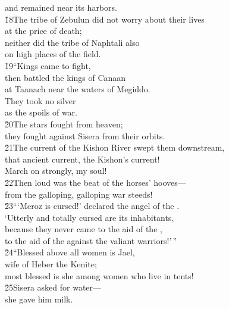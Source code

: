 \begin{poetry}
\poemll    and remained near its harbors. \\
\poeml \v{18}The tribe of Zebulun did not worry about their lives \\
\poemll    at the price of death; \\
\poeml neither did the tribe of Naphtali also \\
\poemll    on high places of the field. \\
\poeml \v{19}``Kings came to fight, \\
\poemll    then battled the kings of Canaan \\
\poemlll       at Taanach near the waters of Megiddo. \\
\poeml They took no silver \\
\poemll    as the spoils of war. \\
\poeml \v{20}The stars fought from heaven; \\
\poemll    they fought against Sisera from their orbits. \\
\poeml \v{21}The current of the Kishon River swept them downstream, \\
\poemll    that ancient current, the Kishon's current! \\
\poemlll       March on strongly, my soul! \\
\poeml \v{22}Then loud was the beat of the horses' hooves--- \\
\poemll    from the galloping, galloping war steeds! \\
\poeml \v{23}```Meroz is cursed!' declared the angel of the . \\
\poemll    `Utterly and totally cursed are its inhabitants, \\
\poeml because they never came to the aid of the , \\
\poemll    to the aid of the  against the valiant warriors!'\,'' \\
\poeml \v{24}``Blessed above all women is Jael, \\
\poemll    wife of Heber the Kenite; \\
\poemlll       most blessed is she among women who live in tents! \\
\poeml \v{25}Sisera asked for water--- \\
\poemll    she gave him milk. \\

\end{poetry}

